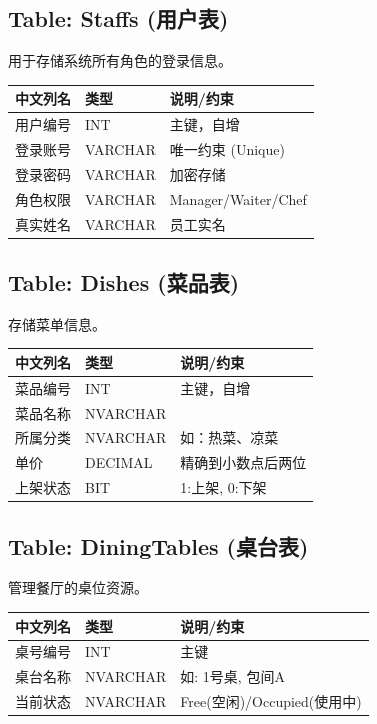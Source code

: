 \documentclass[11pt, a4paper]{article}
\begin{document}
\subsection{Table: Staffs (用户表)}
用于存储系统所有角色的登录信息。
\begin{table}[H] %
    \centering
    \begin{tabular}{p{} p{} p{}}
        \toprule
        \textbf{中文列名} & \textbf{类型} & \textbf{说明/约束} \\
        \midrule
        用户编号 & INT & 主键，自增 \\
        登录账号 & VARCHAR & 唯一约束 (Unique) \\
        登录密码 & VARCHAR & 加密存储 \\
        角色权限 & VARCHAR & Manager/Waiter/Chef \\
        真实姓名 & VARCHAR & 员工实名 \\
        \bottomrule
    \end{tabular}
\end{table}

\subsection{Table: Dishes (菜品表)}
存储菜单信息。
\begin{table}[H] %
    \centering
    \begin{tabular}{p{} p{} p{}}
        \toprule
        \textbf{中文列名} & \textbf{类型} & \textbf{说明/约束} \\
        \midrule
        菜品编号 & INT & 主键，自增 \\
        菜品名称 & NVARCHAR &  \\
        所属分类 & NVARCHAR & 如：热菜、凉菜 \\
        单价 & DECIMAL & 精确到小数点后两位 \\
        上架状态 & BIT & 1:上架, 0:下架 \\
        \bottomrule
    \end{tabular}
\end{table}

\subsection{Table: DiningTables (桌台表)}
管理餐厅的桌位资源。
\begin{table}[H] %
    \centering
    \begin{tabular}{p{} p{} p{}}
        \toprule
        \textbf{中文列名} & \textbf{类型} & \textbf{说明/约束} \\
        \midrule
        桌号编号 & INT & 主键 \\
        桌台名称 & NVARCHAR & 如: 1号桌, 包间A \\
        当前状态 & NVARCHAR & Free(空闲)/Occupied(使用中) \\
        \bottomrule
    \end{tabular}
\end{table}
\end{document}
